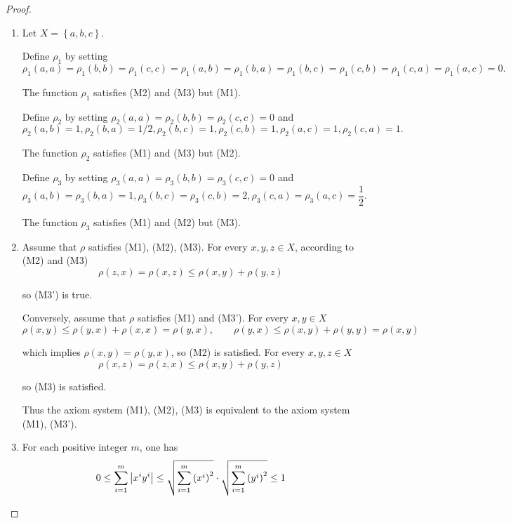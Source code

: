 \begin{proof}
	\begin{enumerate}[label={(\alph*)}]
		\item Let \( X = \left\{ a, b, c \right\} \).

		      Define \( \rho_{1} \) by setting
		      \[
			      \rho_{1}(a, a) = \rho_{1}(b, b) = \rho_{1}(c, c) = \rho_{1}(a, b) = \rho_{1}(b, a) = \rho_{1}(b, c) = \rho_{1}(c, b) = \rho_{1}(c, a) = \rho_{1}(a, c) = 0.
		      \]

		      The function \( \rho_{1} \) satisfies (M2) and (M3) but (M1).

		      Define \( \rho_{2} \) by setting \( \rho_{2}(a, a) = \rho_{2}(b, b) = \rho_{2}(c, c) = 0 \) and
		      \[
			      \rho_{2}(a, b) = 1, \rho_{2}(b, a) = 1/2, \rho_{2}(b, c) = 1, \rho_{2}(c, b) = 1, \rho_{2}(a, c) = 1, \rho_{2}(c, a) = 1.
		      \]

		      The function \( \rho_{2} \) satisfies (M1) and (M3) but (M2).

		      Define \( \rho_{3} \) by setting \( \rho_{3}(a, a) = \rho_{3}(b, b) = \rho_{3}(c, c) = 0 \) and
		      \[
			      \rho_{3}(a, b) = \rho_{3}(b, a) = 1, \rho_{3}(b, c) = \rho_{3}(c, b) = 2, \rho_{3}(c, a) = \rho_{3}(a, c) = \dfrac{1}{2}.
		      \]

		      The function \( \rho_{3} \) satisfies (M1) and (M2) but (M3).
		\item Assume that \( \rho \) satisfies (M1), (M2), (M3). For every \( x, y, z \in X \), according to (M2) and (M3)
		      \[
			      \rho(z, x) = \rho(x, z) \le \rho(x, y) + \rho(y, z)
		      \]

		      so (M3') is true.

		      Conversely, assume that \( \rho \) satisfies (M1) and (M3'). For every \( x, y \in X \)
		      \[
			      \rho(x, y) \le \rho(y, x) + \rho(x, x) = \rho(y, x),\qquad \rho(y, x) \le \rho(x, y) + \rho(y, y) = \rho(x, y)
		      \]

		      which implies \( \rho(x, y) = \rho(y, x) \), so (M2) is satisfied. For every \( x, y, z \in X \)
		      \[
			      \rho(x, z) = \rho(z, x) \le \rho(x, y) + \rho(y, z)
		      \]

		      so (M3) is satisfied.

		      Thus the axiom system (M1), (M2), (M3) is equivalent to the axiom system (M1), (M3').
		\item For each positive integer \( m \), one has
		      \[
			      0 \le \sum_{i=1}^{m} \left\vert{x^{i}y^{i}}\right\vert \le \sqrt{\sum_{i=1}^{m} {(x^{i})}^{2}} \cdot \sqrt{\sum_{i=1}^{m} {(y^{i})}^{2}} \le 1
		      \]


\end{enumerate}
\end{proof}
